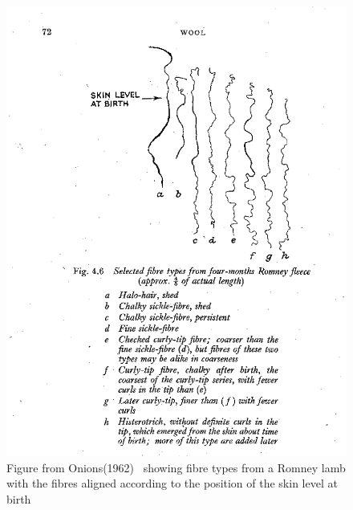 %

\begin{figure}[!h]
  \centering
   \includegraphics[width=1.0\textwidth]{onions2.png}
  \caption{Figure from Onions(1962)~\cite{onio:62} showing fibre types from a Romney lamb with the  fibres aligned according to the position of the skin level at birth}
  \label{fig:onions}
\end{figure}

%

